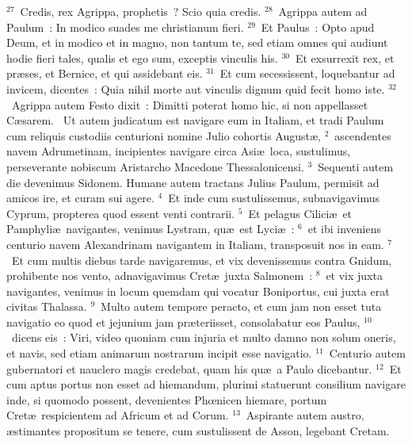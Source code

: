 ${}^{27}$~Credis, rex Agrippa, prophetis~? Scio quia credis.
${}^{28}$~Agrippa autem ad Paulum~: In modico suades me christianum fieri.
${}^{29}$~Et Paulus~: Opto apud Deum, et in modico et in magno, non tantum te, sed etiam omnes qui audiunt hodie fieri tales, qualis et ego sum, exceptis vinculis his.
${}^{30}$~Et exsurrexit rex, et pr\ae ses, et Bernice, et qui assidebant eis.
${}^{31}$~Et cum secessissent, loquebantur ad invicem, dicentes~: Quia nihil morte aut vinculis dignum quid fecit homo iste.
${}^{32}$~Agrippa autem Festo dixit~: Dimitti poterat homo hic, si non appellasset C\ae sarem.
~Ut autem judicatum est navigare eum in Italiam, et tradi Paulum cum reliquis custodiis centurioni nomine Julio cohortis August\ae ,
${}^{2}$~ascendentes navem Adrumetinam, incipientes navigare circa Asi\ae\ loca, sustulimus, perseverante nobiscum Aristarcho Macedone Thessalonicensi.
${}^{3}$~Sequenti autem die devenimus Sidonem. Humane autem tractans Julius Paulum, permisit ad amicos ire, et curam sui agere.
${}^{4}$~Et inde cum sustulissemus, subnavigavimus Cyprum, propterea quod essent venti contrarii.
${}^{5}$~Et pelagus Cilici\ae\ et Pamphyli\ae\ navigantes, venimus Lystram, qu\ae\ est Lyci\ae~:
${}^{6}$~et ibi inveniens centurio navem Alexandrinam navigantem in Italiam, transposuit nos in eam.
${}^{7}$~Et cum multis diebus tarde navigaremus, et vix devenissemus contra Gnidum, prohibente nos vento, adnavigavimus Cret\ae\ juxta Salmonem~:
${}^{8}$~et vix juxta navigantes, venimus in locum quemdam qui vocatur Boniportus, cui juxta erat civitas Thalassa.
${}^{9}$~Multo autem tempore peracto, et cum jam non esset tuta navigatio eo quod et jejunium jam pr\ae teriisset, consolabatur eos Paulus,
${}^{10}$~dicens eis~: Viri, video quoniam cum injuria et multo damno non solum oneris, et navis, sed etiam animarum nostrarum incipit esse navigatio.
${}^{11}$~Centurio autem gubernatori et nauclero magis credebat, quam his qu\ae\ a Paulo dicebantur.
${}^{12}$~Et cum aptus portus non esset ad hiemandum, plurimi statuerunt consilium navigare inde, si quomodo possent, devenientes Phœnicen hiemare, portum Cret\ae\ respicientem ad Africum et ad Corum.
${}^{13}$~Aspirante autem austro, \ae stimantes propositum se tenere, cum sustulissent de Asson, legebant Cretam.


